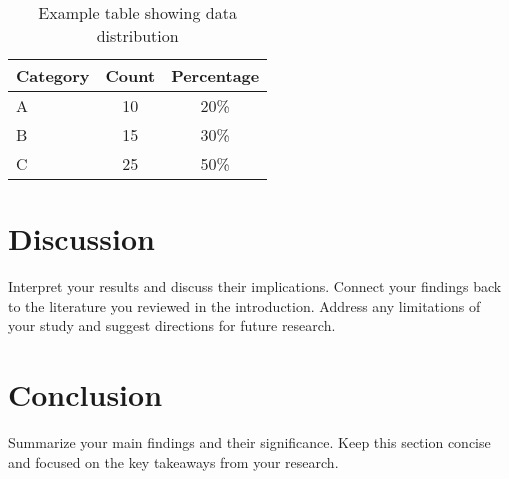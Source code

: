 \documentclass[12pt]{article}
\begin{document}
  \begin{table}[ht]
    \centering
    \begin{tabular}{lcc}
      \hline
      Category & Count & Percentage \\
      \hline
      A & 10 & 20\% \\
      B & 15 & 30\% \\
      C & 25 & 50\% \\
      \hline
    \end{tabular}
    \caption{Example table showing data distribution}
    \label{tab:distribution}
  \end{table}

\section{Discussion}
  Interpret your results and discuss their implications. Connect your findings 
  back to the literature you reviewed in the introduction. Address any 
  limitations of your study and suggest directions for future research.

\section{Conclusion}
  Summarize your main findings and their significance. Keep this section concise 
  and focused on the key takeaways from your research.

\singlespacing  %


\end{document}
